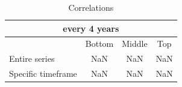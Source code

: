 \begin{table}[h!]
\centering
\caption{Correlations}
\begin{tabular}{|l|c|c|c|}
\hline
\multicolumn{4}{|c|}{every 4 years} \\ \hline
& Bottom & Middle & Top \\ \hline
Entire series & NaN & NaN & NaN \\ \hline
Specific timeframe & NaN & NaN & NaN \\ \hline
\end{tabular}
\end{table}
